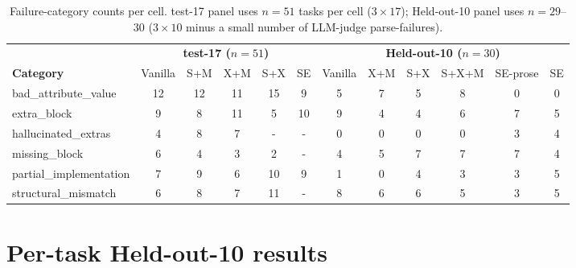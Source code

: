 \documentclass{article}
\begin{document}
\begin{table}[h]
  \caption{Failure-category counts per cell. test-17 panel uses $n=51$ tasks per cell ($3{\times}17$); Held-out-10 panel uses $n=29$--$30$ ($3{\times}10$ minus a small number of LLM-judge parse-failures).}
  \label{tab:bottleneck}
  \centering
  \footnotesize
  \begin{tabular}{l|ccccc|cccccc}
    \toprule
    & \multicolumn{5}{c|}{\textbf{test-17 ($n=51$)}} & \multicolumn{6}{c}{\textbf{Held-out-10 ($n=30$)}} \\
    \textbf{Category} & Vanilla & S+M & X+M & S+X & SE & Vanilla & X+M & S+X & S+X+M & SE-prose & SE \\
    \midrule
    bad\_attribute\_value     & 12 & 12 & 11 & 15 & 9  & 5 & 7 & 5 & 8 & 0 & 0 \\
    extra\_block              &  9 &  8 & 11 &  5 & 10 & 9 & 4 & 4 & 6 & 7 & 5 \\
    hallucinated\_extras      &  4 &  8 &  7 &  - &  - & 0 & 0 & 0 & 0 & 3 & 4 \\
    missing\_block            &  6 &  4 &  3 &  2 &  - & 4 & 5 & 7 & 7 & 7 & 4 \\
    partial\_implementation   &  7 &  9 &  6 & 10 &  9 & 1 & 0 & 4 & 3 & 3 & 5 \\
    structural\_mismatch      &  6 &  8 &  7 & 11 &  - & 8 & 6 & 6 & 5 & 3 & 5 \\
    \bottomrule
  \end{tabular}
\end{table}

\section{Per-task Held-out-10 results}
\label{app:per-task}
\end{document}
